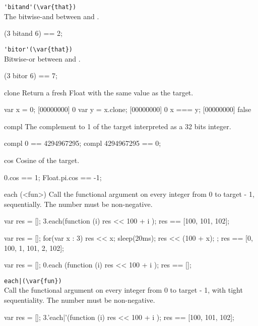 \begin{urbiscriptapi}
\item \lstinline|'bitand'(\var{that})|\\
  The bitwise-and between \this and .
\begin{urbiassert}
(3 bitand 6) == 2;
\end{urbiassert}

\item \lstinline|'bitor'(\var{that})|\\
  Bitwise-or between \this and .
\begin{urbiassert}
(3 bitor 6) == 7;
\end{urbiassert}

\item[clone]
  Return a fresh Float with the same value as the target.
\begin{urbiscript}
var x = 0;
[00000000] 0
var y = x.clone;
[00000000] 0
x === y;
[00000000] false
\end{urbiscript}

\item[compl]
  The complement to 1 of the target interpreted as a 32 bits integer.
\begin{urbiassert}
compl 0 == 4294967295;
compl 4294967295 == 0;
\end{urbiassert}

\item[cos]
  Cosine of the target.
\begin{urbiassert}
0.cos == 1;
Float.pi.cos == -1;
\end{urbiassert}

\item[each](<fun>)%
  Call the functional argument  on every integer from 0 to
  target - 1, sequentially.  The number must be non-negative.
\begin{urbiassert}
{
  var res = [];
  3.each(function (i) { res << 100 + i });
  res
}
== [100, 101, 102];

{
  var res = [];
  for(var x : 3) { res << x; sleep(20ms); res << (100 + x); };
  res
}
== [0, 100, 1, 101, 2, 102];

{
  var res = [];
  0.each (function (i) { res << 100 + i });
  res
}
== [];
\end{urbiassert}

\item \lstinline'each|(\var{fun})'\\
  Call the functional argument  on every integer from 0 to
  target - 1, with tight sequentiality.  The number must be
  non-negative.
\begin{urbiassert}
{
  var res = [];
  3.'each|'(function (i) { res << 100 + i });
  res
}
== [100, 101, 102];


\end{urbiassert}
\end{urbiscriptapi}
